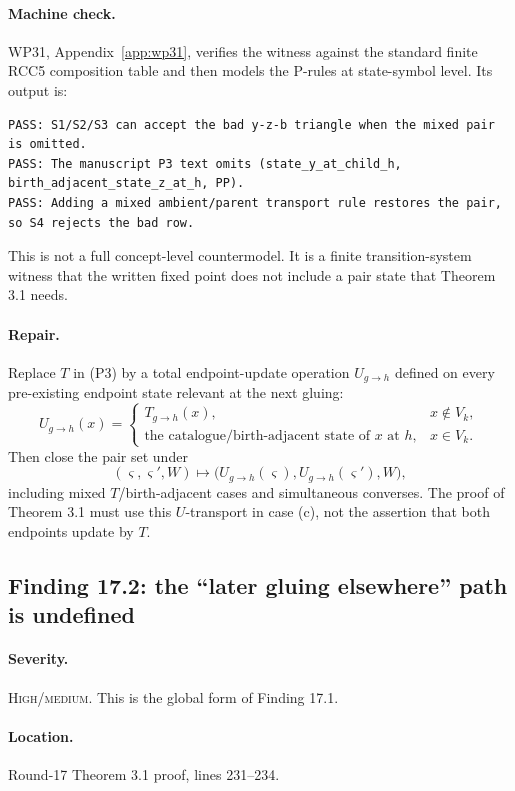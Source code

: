 \documentclass[11pt]{article}
\newcommand{\sev}[1]{\textsc{#1}}
\begin{document}
\paragraph{Machine check.}  WP31, Appendix~\ref{app:wp31}, verifies the witness against the standard finite RCC5 composition table and then models the P-rules at state-symbol level.  Its output is:
\begin{lstlisting}[style=reviewtext]
PASS: S1/S2/S3 can accept the bad y-z-b triangle when the mixed pair is omitted.
PASS: The manuscript P3 text omits (state_y_at_child_h, birth_adjacent_state_z_at_h, PP).
PASS: Adding a mixed ambient/parent transport rule restores the pair, so S4 rejects the bad row.
\end{lstlisting}
This is not a full concept-level countermodel.  It is a finite transition-system witness that the written fixed point does not include a pair state that Theorem 3.1 needs.

\paragraph{Repair.}  Replace $T$ in (P3) by a total endpoint-update operation $U_{g\to h}$ defined on every pre-existing endpoint state relevant at the next gluing:
\[
  U_{g\to h}(x)=
  \begin{cases}
    T_{g\to h}(x), & x\notin V_k,\\
    \text{the catalogue/birth-adjacent state of }x\text{ at }h, & x\in V_k.
  \end{cases}
\]
Then close the pair set under
\[
  (\varsigma,\varsigma',W)
  \longmapsto
  \bigl(U_{g\to h}(\varsigma),U_{g\to h}(\varsigma'),W\bigr),
\]
including mixed $T$/birth-adjacent cases and simultaneous converses.  The proof of Theorem 3.1 must use this $U$-transport in case (c), not the assertion that both endpoints update by $T$.

\subsection{Finding 17.2: the ``later gluing elsewhere'' path is undefined}

\paragraph{Severity.} \sev{High/medium}.  This is the global form of Finding 17.1.

\paragraph{Location.} Round-17 Theorem 3.1 proof, lines 231--234.
\end{document}
